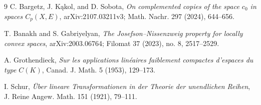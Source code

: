 \documentclass[11pt]{article}
\begin{document}
\begin{thebibliography}{9}
\setlength{\itemsep}{0.4em}
C. Bargetz, J. K\k{a}kol, and D. Sobota,
\emph{On complemented copies of the space $c_0$ in spaces $C_p(X,E)$},
arXiv:2107.03211v3; Math. Nachr. 297 (2024), 644--656.

T. Banakh and S. Gabriyelyan,
\emph{The Josefson--Nissenzweig property for locally convex spaces},
arXiv:2003.06764; Filomat 37 (2023), no. 8, 2517--2529.

A. Grothendieck,
\emph{Sur les applications lin\'eaires faiblement compactes d'espaces du type
$C(K)$},
Canad. J. Math. 5 (1953), 129--173.

I. Schur,
\emph{\"Uber lineare Transformationen in der Theorie der unendlichen Reihen},
J. Reine Angew. Math. 151 (1921), 79--111.
\end{thebibliography}
\end{document}
